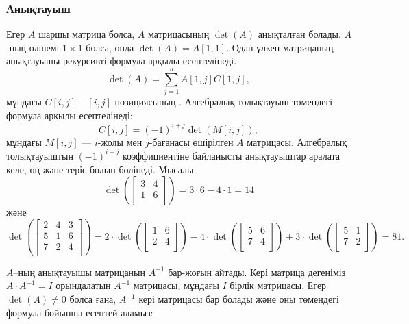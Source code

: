 \subsubsection{Анықтауыш}


Егер $A$ шаршы матрица болса, $A$ матрицасының  $\det(A)$
анықталған болады. 
$A$-ның өлшемі $1 \times 1$ болса,
онда $\det(A)=A[1,1]$. Одан үлкен матрицаның
анықтауышы рекурсивті формула 
арқылы есептелінеді. 
\[\det(A)=\sum_{j=1}^n A[1,j] C[1,j],\]
мұндағы $C[i,j]$ -- $[i,j]$ позициясының .
Алгебралық толықтауыш төмендегі формула арқылы есептелінеді:
\[C[i,j] = (-1)^{i+j} \det(M[i,j]),\]
мұндағы $M[i,j]$ ––
$i$-жолы мен $j$-бағанасы өшірілген $A$ матрицасы.
Алгебралық толықтауыштың $(-1)^{i+j}$ коэффициентіне байланысты
анықтауыштар аралата келе, оң және теріс болып бөлінеді. 
Мысалы
\[
\det(
 \begin{bmatrix}
  3 & 4 \\
  1 & 6 \\
 \end{bmatrix}
) = 3 \cdot 6 - 4 \cdot 1 = 14 
\]
және
\[
\det(
 \begin{bmatrix}
  2 & 4 & 3 \\
  5 & 1 & 6 \\
  7 & 2 & 4 \\
 \end{bmatrix}
) = 
2 \cdot
\det(
 \begin{bmatrix}
  1 & 6 \\
  2 & 4 \\
 \end{bmatrix}
)
-4 \cdot
\det(
 \begin{bmatrix}
  5 & 6 \\
  7 & 4 \\
 \end{bmatrix}
)
+3 \cdot
\det(
 \begin{bmatrix}
  5 & 1 \\
  7 & 2 \\
 \end{bmatrix}
) = 81.
\]


$A$–ның анықтауышы матрицаның  $A^{-1}$ бар-жоғын айтады.
Кері матрица дегеніміз $A \cdot A^{-1} = I$
орындалатын $A^{-1}$ матрицасы, мұндағы 
$I$ бірлік матрицасы. Егер
$\det(A) \neq 0$ болса ғана, $A^{-1}$ кері матрицасы бар болады және оны төмендегі формула
бойынша есептей аламыз:

